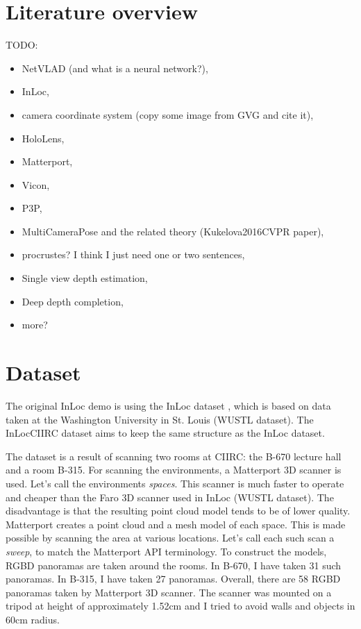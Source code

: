 \documentclass[twoside]{ctuthesis}
\theoremstyle{plain}
\theoremstyle{definition}
\theoremstyle{note}
\begin{document}
\chapter{Literature overview}
\label{literature-overview-chapter}
TODO:
\begin{itemize}
	\item NetVLAD (and what is a neural network?),
	\item InLoc,
	\item camera coordinate system (copy some image from GVG and cite it),
	\item HoloLens,
	\item Matterport,
	\item Vicon,
	\item P3P,
	\item MultiCameraPose and the related theory (Kukelova2016CVPR paper),
	\item procrustes? I think I just need one or two sentences,
	\item Single view depth estimation,
	\item Deep depth completion,
	\item more?
\end{itemize}

\chapter{Dataset}
The original InLoc demo is using the InLoc dataset \cite{taira2018inloc}, which is based on data taken at the Washington University in St. Louis (WUSTL dataset). The InLocCIIRC dataset aims to keep the same structure as the InLoc dataset.

The dataset is a result of scanning two rooms at CIIRC: the B-670 lecture hall and a room B-315. For scanning the environments, a Matterport 3D scanner is used. Let's call the environments \emph{spaces}. This scanner is much faster to operate and cheaper than the Faro 3D scanner used in InLoc (WUSTL dataset). The disadvantage is that the resulting point cloud model tends to be of lower quality. Matterport creates a point cloud and a mesh model of each space. This is made possible by scanning the area at various locations. Let's call each such scan a \emph{sweep}, to match the Matterport API terminology. To construct the models, RGBD panoramas are taken around the rooms. In B-670, I have taken 31 such panoramas. In B-315, I have taken 27 panoramas. Overall, there are 58 RGBD panoramas taken by Matterport 3D scanner. The scanner was mounted on a tripod at height of approximately 1.52cm and I tried to avoid walls and objects in 60cm radius.
\end{document}
